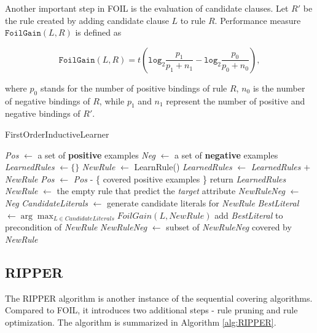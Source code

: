 Another important step in FOIL is the evaluation of candidate clauses. Let $R'$ be the rule created by adding candidate clause $L$ to rule $R$. Performance measure $\mathtt{FoilGain}(L,R)$ is defined as

\begin{equation}
	\mathtt{FoilGain}(L,R) = t \left ( \mathtt{log}_2 \frac{p_1}{p_1 + n_1} - \mathtt{log}_2 \frac{p_0}{p_0 + n_0} \right ),
\end{equation}

where $p_0$ stands for the number of positive bindings of rule $R$, $n_0$ is the number of negative bindings of $R$, while $p_1$ and $n_1$ represent the number of positive and negative bindings of $R'$. 

\begin{algorithm}
	\caption{FirstOrderInductiveLearner}
	\label{alg:FOIL}
	\begin{algorithmic}[1]
			\State \textit{Pos} $\gets$ a set of \textbf{positive} examples
			\State \textit{Neg} $\gets$ a set of \textbf{negative} examples
			\State \textit{LearnedRules} $\gets \{ \}$ 
				\State \textit{NewRule} $\gets$ LearnRule()
				\State \textit{LearnedRules} $\gets$ \textit{LearnedRules} $+$ \textit{NewRule}
				\State \textit{Pos} $\gets$ \textit{Pos} - \{ covered positive examples \}
			\EndWhile
			\State return \textit{LearnedRules}
		\EndFunction
		\Statex
			\State \textit{NewRule} $\gets$ the empty rule that predict the \textit{target} attribute
			\State \textit{NewRuleNeg} $\gets$ \textit{Neg}
				\State \textit{CandidateLiterals} $\gets$ generate candidate literals for \textit{NewRule}
				\State \textit{BestLiteral} $\gets  \arg\max_{L \in CandidateLiterals}FoilGain(L, NewRule)$
				\State add \textit{BestLiteral} to precondition of \textit{NewRule}
				\State \textit{NewRuleNeg} $\gets$ subset of \textit{NewRuleNeg} covered by \textit{NewRule}
			\EndWhile		
		\EndFunction
	\end{algorithmic}
\end{algorithm}







\subsection{RIPPER}

The RIPPER algorithm is another instance of the sequential covering algorithms. Compared to FOIL, it introduces two additional steps - rule pruning and rule optimization. The algorithm is summarized in Algorithm \ref{alg:RIPPER}. \\

